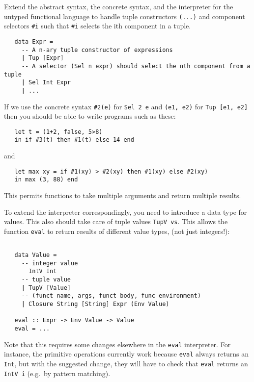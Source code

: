 \documentclass[a4paper]{article}
\begin{document}
\begin{exercise}\label{exer-fun-tuples-eval}
  Extend the abstract syntax, the concrete syntax, and the interpreter
  for the untyped functional language to handle tuple constructors
  \texttt{(...)} and component selectors \verb+#i+ such that \verb+#i+ selects the ith component in a tuple.

{\codesetup\begin{verbatim}
   data Expr = 
     -- A n-ary tuple constructor of expressions
     | Tup [Expr]   
     -- A selector (Sel n expr) should select the nth component from a tuple
     | Sel Int Expr 
     | ...
\end{verbatim}}

\noindent
If we use the concrete syntax \verb+#2(e)+ for \texttt{Sel 2 e} and
\texttt{(e1, e2)} for \texttt{Tup [e1, e2]} then you should be able to
write programs such as these:

{\codesetup\begin{verbatim}
   let t = (1+2, false, 5>8)
   in if #3(t) then #1(t) else 14 end
\end{verbatim}}

\noindent
and

{\codesetup\begin{verbatim}
   let max xy = if #1(xy) > #2(xy) then #1(xy) else #2(xy) 
   in max (3, 88) end
\end{verbatim}}

\noindent
This permits functions to take multiple arguments and return multiple
results.

To extend the interpreter correspondingly, you need to introduce a data type for values. This also should take care of tuple values \texttt{TupV vs}. This allows the function
\texttt{eval} to return results of different value types, (not just integers!):

{\codesetup\begin{verbatim}

   data Value = 
     -- integer value
       IntV Int     
     -- tuple value
     | TupV [Value]
     -- (funct name, args, funct body, func environment)
     | Closure String [String] Expr (Env Value) 
   
   eval :: Expr -> Env Value -> Value
   eval = ...
\end{verbatim}}

\noindent 
Note that this requires some changes elsewhere in the \texttt{eval}
interpreter.  For instance, the primitive operations currently work
because \texttt{eval} always returns an \texttt{Int}, but with the
suggested change, they will have to check that \texttt{eval} returns
an \texttt{IntV i} (e.g.\ by pattern matching).\\


\end{exercise}
\end{document}
